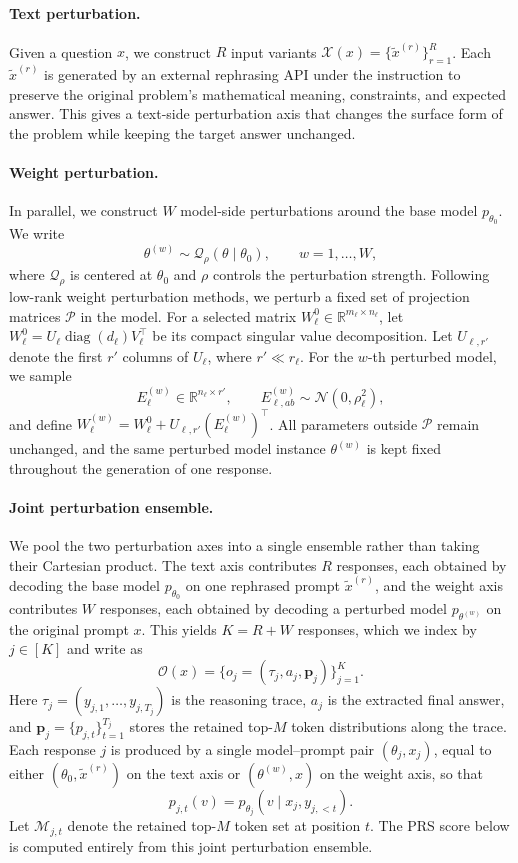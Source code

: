 \documentclass{article} %
\begin{document}
\paragraph{Text perturbation.}
Given a question $x$, we construct $R$ input variants
$\mathcal{X}(x)=\{\tilde{x}^{(r)}\}_{r=1}^{R}$.
Each $\tilde{x}^{(r)}$ is generated by an external rephrasing API under the
instruction to preserve the original problem's mathematical meaning,
constraints, and expected answer. This gives a text-side perturbation axis that
changes the surface form of the problem while keeping the target answer
unchanged.

\paragraph{Weight perturbation.}
In parallel, we construct $W$ model-side perturbations around the base model
$p_{\theta_0}$. We write
\[
\theta^{(w)} \sim \mathcal{Q}_{\rho}(\theta\mid \theta_0),
\qquad w=1,\ldots,W,
\]
where $\mathcal{Q}_{\rho}$ is centered at $\theta_0$ and $\rho$ controls the
perturbation strength. Following low-rank weight perturbation methods, we
perturb a fixed set of projection matrices $\mathcal{P}$ in the model. For a
selected matrix $W_\ell^0\in\mathbb{R}^{m_\ell\times n_\ell}$, let
$W_\ell^0 = U_\ell \operatorname{diag}(d_\ell)V_\ell^\top$
be its compact singular value decomposition. Let $U_{\ell,r'}$ denote the first
$r'$ columns of $U_\ell$, where $r'\ll r_\ell$. For the $w$-th perturbed model,
we sample
\[
E_{\ell}^{(w)}\in\mathbb{R}^{n_\ell\times r'},
\qquad
E_{\ell,ab}^{(w)}\sim\mathcal{N}(0,\rho_\ell^2),
\]
and define
$W_\ell^{(w)} = W_\ell^0 + U_{\ell,r'}\left(E_{\ell}^{(w)}\right)^\top$.
All parameters outside $\mathcal{P}$ remain unchanged, and the same perturbed
model instance $\theta^{(w)}$ is kept fixed throughout the generation of one
response.

\paragraph{Joint perturbation ensemble.}
We pool the two perturbation axes into a single ensemble rather than taking their
Cartesian product. The text axis contributes $R$ responses, each obtained by
decoding the base model $p_{\theta_0}$ on one rephrased prompt
$\tilde{x}^{(r)}$, and the weight axis contributes $W$ responses, each obtained
by decoding a perturbed model $p_{\theta^{(w)}}$ on the original prompt $x$. This
yields $K=R+W$ responses, which we index by $j\in[K]$ and write as
\[
\mathcal{O}(x)
=
\{o_j=(\tau_j,a_j,\mathbf{p}_j)\}_{j=1}^{K}.
\]
Here $\tau_j=(y_{j,1},\ldots,y_{j,T_j})$ is the reasoning trace, $a_j$ is the
extracted final answer, and $\mathbf{p}_j=\{p_{j,t}\}_{t=1}^{T_j}$ stores the
retained top-$M$ token distributions along the trace. Each response $j$ is
produced by a single model--prompt pair $(\theta_j,x_j)$, equal to either
$(\theta_0,\tilde{x}^{(r)})$ on the text axis or $(\theta^{(w)},x)$ on the weight
axis, so that
\[
p_{j,t}(v)
=
p_{\theta_j}(v\mid x_j,y_{j,<t}).
\]
Let $\mathcal{M}_{j,t}$ denote the retained top-$M$ token set at position $t$.
The PRS score below is computed entirely from this joint perturbation ensemble.
\end{document}
